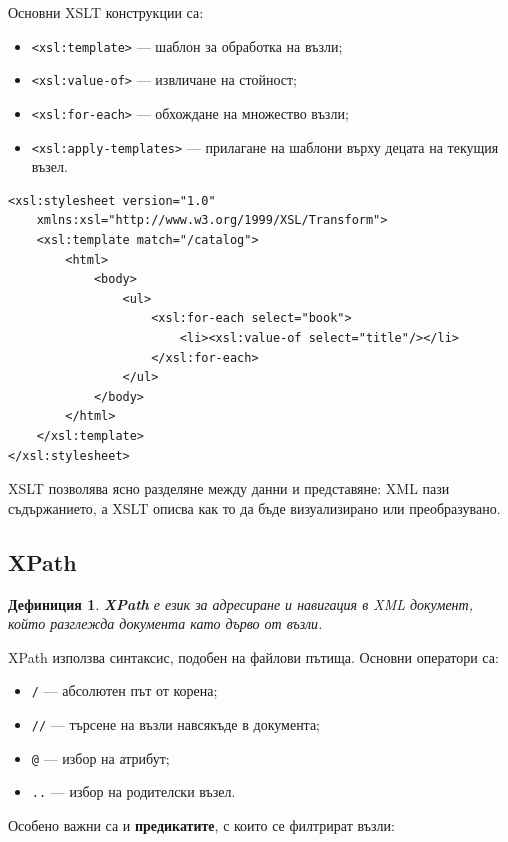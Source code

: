 \documentclass{scrartcl}
\newtheorem{definition}{Дефиниция}
\begin{document}
\begin{FlushLeft}
Основни XSLT конструкции са:

\begin{itemize}
    \item \texttt{<xsl:template>} --- шаблон за обработка на възли;
    \item \texttt{<xsl:value-of>} --- извличане на стойност;
    \item \texttt{<xsl:for-each>} --- обхождане на множество възли;
    \item \texttt{<xsl:apply-templates>} --- прилагане на шаблони върху децата на текущия възел.
\end{itemize}

\begin{lstlisting}[caption=XSLT example]
<xsl:stylesheet version="1.0"
    xmlns:xsl="http://www.w3.org/1999/XSL/Transform">
    <xsl:template match="/catalog">
        <html>
            <body>
                <ul>
                    <xsl:for-each select="book">
                        <li><xsl:value-of select="title"/></li>
                    </xsl:for-each>
                </ul>
            </body>
        </html>
    </xsl:template>
</xsl:stylesheet>
\end{lstlisting}

XSLT позволява ясно разделяне между данни и представяне: XML пази съдържанието, а XSLT описва как то да бъде визуализирано или преобразувано.

\subsection{XPath}

\begin{definition}
\textbf{XPath} е език за адресиране и навигация в XML документ, който разглежда документа като дърво от възли.
\end{definition}

XPath използва синтаксис, подобен на файлови пътища. Основни оператори са:

\begin{itemize}
    \item \texttt{/} --- абсолютен път от корена;
    \item \texttt{//} --- търсене на възли навсякъде в документа;
    \item \texttt{@} --- избор на атрибут;
    \item \texttt{..} --- избор на родителски възел.
\end{itemize}

Особено важни са и \textbf{предикатите}, с които се филтрират възли:


\end{FlushLeft}
\end{document}
